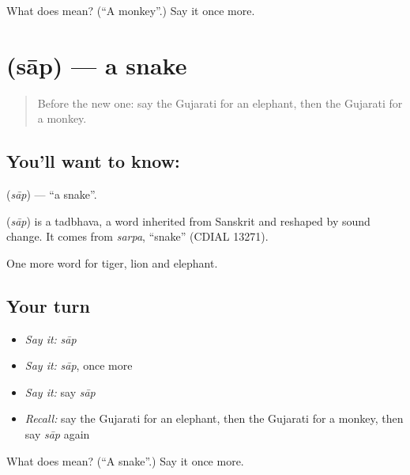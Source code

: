\begin{tcolorbox}[breakable,colback=teal!4,colframe=teal!35!black,title={Before you move on}]
What does  mean? (\textquotedblleft{}A monkey\textquotedblright{}.) Say it once more.
\end{tcolorbox}
\section[\texorpdfstring{\gu{સાપ} (sāp)}{સાપ (sāp)}]{ (sāp) — a snake}

\label{lesson:GU-C68-snake}



\begin{quote}
Before the new one: say the Gujarati for an elephant, then the Gujarati for a monkey.
\end{quote}

\subsection*{You'll want to know: }
\textbf{} (\emph{sāp}) — \textquotedblleft{}a snake\textquotedblright{}.

\begin{cousinweb}
\textbf{} (\emph{sāp}) is a tadbhava, a word inherited from Sanskrit and reshaped by sound change. It comes from \emph{sarpa}, \textquotedblleft{}snake\textquotedblright{} (CDIAL 13271).
\end{cousinweb}

\begin{grammarlens}[title={What you've built}]
One more word for tiger, lion and elephant.
\end{grammarlens}

\subsection*{Your turn}
\begin{itemize}
\raggedright
  \item \emph{Say it:} \emph{sāp}
  \item \emph{Say it:} \emph{sāp}, once more
  \item \emph{Say it:} say \emph{sāp}
  \item \emph{Recall:} say the Gujarati for an elephant, then the Gujarati for a monkey, then say \emph{sāp} again
\end{itemize}

\begin{tcolorbox}[breakable,colback=teal!4,colframe=teal!35!black,title={Before you move on}]
What does  mean? (\textquotedblleft{}A snake\textquotedblright{}.) Say it once more.
\end{tcolorbox}

